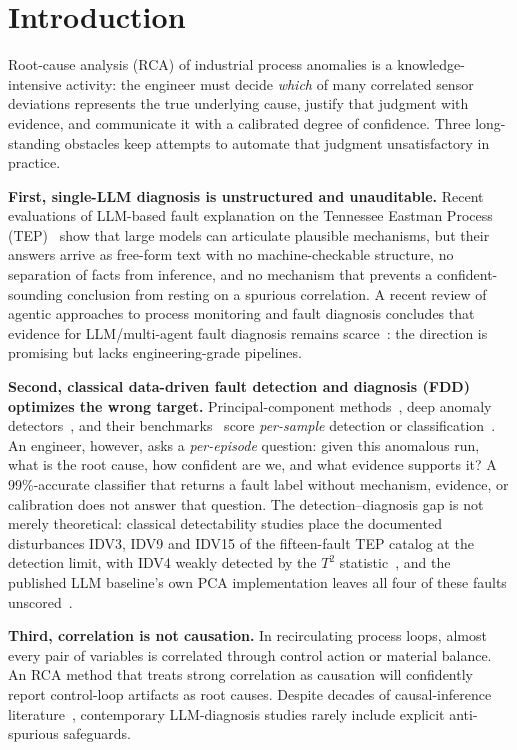 \documentclass[preprint,10pt]{elsarticle}
\begin{document}
\section{Introduction}
\label{sec:intro}

Root-cause analysis (RCA) of industrial process anomalies is a knowledge-intensive activity: the engineer must decide \emph{which} of many correlated sensor deviations represents the true underlying cause, justify that judgment with evidence, and communicate it with a calibrated degree of confidence. Three long-standing obstacles keep attempts to automate that judgment unsatisfactory in practice.

\textbf{First, single-LLM diagnosis is unstructured and unauditable.} Recent evaluations of LLM-based fault explanation on the Tennessee Eastman Process (TEP)~\cite{khan2024faultexplainer} show that large models can articulate plausible mechanisms, but their answers arrive as free-form text with no machine-checkable structure, no separation of facts from inference, and no mechanism that prevents a confident-sounding conclusion from resting on a spurious correlation. A recent review of agentic approaches to process monitoring and fault diagnosis concludes that evidence for LLM/multi-agent fault diagnosis remains scarce~\cite{agentic2026review}: the direction is promising but lacks engineering-grade pipelines.

\textbf{Second, classical data-driven fault detection and diagnosis (FDD) optimizes the wrong target.} Principal-component methods~\cite{kano2002comparison}, deep anomaly detectors~\cite{tuli2022tranad,pozdnyakov2024adversarial}, and their benchmarks~\cite{rieth2017additional} score \emph{per-sample} detection or classification~\cite{qin2012survey}. An engineer, however, asks a \emph{per-episode} question: given this anomalous run, what is the root cause, how confident are we, and what evidence supports it? A 99\%-accurate classifier that returns a fault label without mechanism, evidence, or calibration does not answer that question. The detection--diagnosis gap is not merely theoretical: classical detectability studies place the documented disturbances IDV3, IDV9 and IDV15 of the fifteen-fault TEP catalog at the detection limit, with IDV4 weakly detected by the $T^2$ statistic~\cite{russell2000delay,chiang2001fault}, and the published LLM baseline's own PCA implementation leaves all four of these faults unscored~\cite{khan2024faultexplainer}.

\textbf{Third, correlation is not causation.} In recirculating process loops, almost every pair of variables is correlated through control action or material balance. An RCA method that treats strong correlation as causation will confidently report control-loop artifacts as root causes. Despite decades of causal-inference literature~\cite{yuan2014root,bauer2007finding}, contemporary LLM-diagnosis studies rarely include explicit anti-spurious safeguards.
\end{document}
